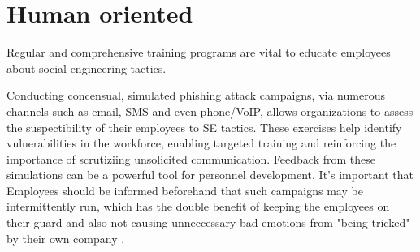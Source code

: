 \begin{comment}
A single dataset formulated as a CSV (comma-separated values) can contain ten or hundreds of thousands of rows of data, each with an URL and data whether it is a legitimate URL or a phishing one.



AI has revolutionized the field of phishing detection by introducing advanced techniques that significantly enhance the accuracy and efficiency of identifying malicious activities.

\subsubsection{AI-assisted deepfake detection}

Building on the foundations of machine learning and other AI technologies discussed above, deepfake detection via AI methods is likewise very resource intensive.

\end{comment}


\section{Human oriented}
\begin{comment}
    
    - The best defense against SE attacks is an educated, conscious user
    - User education should be continuous and not a one-off event

\end{comment}

Regular and comprehensive training programs are vital to educate employees about social engineering tactics.

Conducting concensual, simulated phishing attack campaigns, via numerous channels such as email, SMS and even phone/VoIP, allows organizations to assess the suspectibility of their employees to SE tactics. These exercises help identify vulnerabilities in the workforce, enabling targeted training and reinforcing the importance of scrutiziing unsolicited communication. Feedback from these simulations can be a powerful tool for personnel development. It's important that Employees should be informed beforehand that such campaigns may be intermittently run, which has the double benefit of keeping the employees on their guard and also not causing unneccessary bad emotions from "being tricked" by their own company \citep{hadnagySocialEngineering2018, mitnickArtDeceptionControlling2003}.

